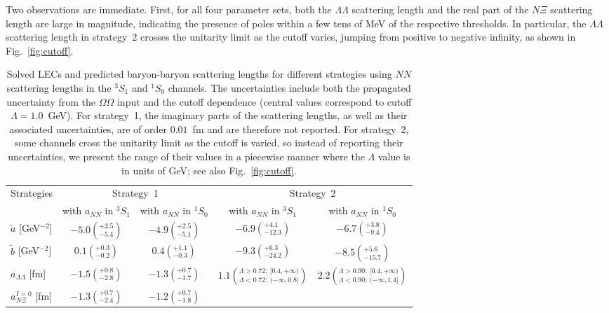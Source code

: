 \documentclass[prl,showpacs,twocolumn,superscriptaddress,floatfix,10pt,footinbib]{revtex4-2}
\begin{document}
Two observations are immediate. First, for all four parameter sets, both the $\Lambda\Lambda$ scattering length and the real part of the $N\Xi$ scattering length are large in magnitude, indicating the presence of poles within a few tens of MeV of the respective thresholds. In particular, the $\Lambda\Lambda$ scattering length in strategy~2 crosses the unitarity limit as the cutoff varies, jumping from positive to negative infinity, as shown in Fig.~\ref{fig:cutoff}.

\begin{table}[tb]
\centering
\caption{Solved LECs and predicted baryon-baryon scattering lengths for different strategies using $NN$ scattering lengths in the $^3S_1$ and $^1S_0$ channels. The uncertainties include both the propagated uncertainty from the $\Omega\Omega$ input and the cutoff dependence (central values correspond to cutoff $\Lambda=1.0$~GeV). For strategy~1, the imaginary parts of the scattering lengths, as well as their associated uncertainties, are of order $0.01$~fm and are therefore not reported. For strategy~2, some channels cross the unitarity limit as the cutoff is varied, so instead of reporting their uncertainties, we present the range of their values in a piecewise manner where the $\Lambda$ value is in units of GeV; see also Fig.~\ref{fig:cutoff}.}
\begin{tabular}{p{5em}cccc}
\toprule
\multirow{2}{*}{Strategies} & \multicolumn{2}{c}{Strategy~1} & \multicolumn{2}{c}{Strategy~2} \\
\cmidrule(lr){2-3}\cmidrule(lr){4-5}
& \quad with $a_{NN}$ in $^3S_1$\quad & \quad with $a_{NN}$ in $^1S_0$\quad & \quad with $a_{NN}$ in $^3S_1$\quad & \quad with $a_{NN}$ in $^1S_0$\quad \\
\midrule
$\tilde{a}$ [GeV$^{-2}$]
& $-5.0\left(^{+2.5}_{-5.4}\right)$
& $-4.9\left(^{+2.5}_{-5.1}\right)$
& $-6.9\left(^{+4.1}_{-12.3}\right)$
& $-6.7\left(^{+3.8}_{-9.4}\right)$ \\[5pt]
$\tilde{b}$ [GeV$^{-2}$]
& $0.1\left(^{+0.3}_{-0.2}\right)$
& $0.4\left(^{+1.1}_{-0.3}\right)$
& $-9.3\left(^{+6.3}_{-24.2}\right)$
& $-8.5\left(^{+5.6}_{-15.7}\right)$ \\
\midrule
$a_{\Lambda\Lambda}$ [fm]
& $-1.5\left(^{+0.8}_{-2.8}\right)$
& $-1.3\left(^{+0.7}_{-1.7}\right)$
& $1.1\left(^{\Lambda>0.72:~[0.4,+\infty)}_{\Lambda<0.72:~(-\infty,0.8]}\right)$
& $2.2\left(^{\Lambda>0.90:~[0.4,+\infty)}_{\Lambda<0.90:~(-\infty,1.4]}\right)$ \\[5pt]
$a_{N\Xi}^{I=0}$ [fm]
& $-1.3\left(^{+0.7}_{-2.4}\right)$
& $-1.2\left(^{+0.7}_{-1.8}\right)$

\end{tabular}
\end{table}
\end{document}
